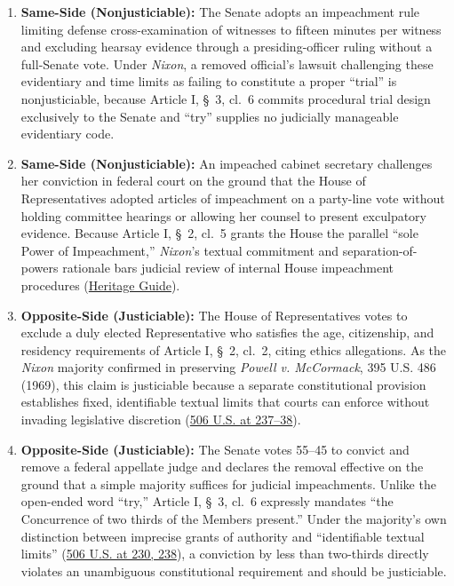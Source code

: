 \documentclass[12pt]{article}
\begin{document}
\begin{enumerate}
\item \textbf{Same-Side (Nonjusticiable):} The Senate adopts an impeachment rule limiting defense cross-examination of witnesses to fifteen minutes per witness and excluding hearsay evidence through a presiding-officer ruling without a full-Senate vote. Under \textit{Nixon}, a removed official's lawsuit challenging these evidentiary and time limits as failing to constitute a proper ``trial'' is nonjusticiable, because Article I, \S~3, cl.\ 6 commits procedural trial design exclusively to the Senate and ``try'' supplies no judicially manageable evidentiary code.

\item \textbf{Same-Side (Nonjusticiable):} An impeached cabinet secretary challenges her conviction in federal court on the ground that the House of Representatives adopted articles of impeachment on a party-line vote without holding committee hearings or allowing her counsel to present exculpatory evidence. Because Article I, \S~2, cl.\ 5 grants the House the parallel ``sole Power of Impeachment,'' \textit{Nixon}'s textual commitment and separation-of-powers rationale bars judicial review of internal House impeachment procedures (\href{https://constitution.heritage.org/essays/a1-s2-c5-b/}{Heritage Guide}).

\item \textbf{Opposite-Side (Justiciable):} The House of Representatives votes to exclude a duly elected Representative who satisfies the age, citizenship, and residency requirements of Article I, \S~2, cl.\ 2, citing ethics allegations. As the \textit{Nixon} majority confirmed in preserving \textit{Powell v. McCormack}, 395 U.S. 486 (1969), this claim is justiciable because a separate constitutional provision establishes fixed, identifiable textual limits that courts can enforce without invading legislative discretion (\href{https://supreme.justia.com/cases/federal/us/506/224/}{506 U.S. at 237--38}).

\item \textbf{Opposite-Side (Justiciable):} The Senate votes 55--45 to convict and remove a federal appellate judge and declares the removal effective on the ground that a simple majority suffices for judicial impeachments. Unlike the open-ended word ``try,'' Article I, \S~3, cl.\ 6 expressly mandates ``the Concurrence of two thirds of the Members present.'' Under the majority's own distinction between imprecise grants of authority and ``identifiable textual limits'' (\href{https://supreme.justia.com/cases/federal/us/506/224/}{506 U.S. at 230, 238}), a conviction by less than two-thirds directly violates an unambiguous constitutional requirement and should be justiciable.


\end{enumerate}
\end{document}
